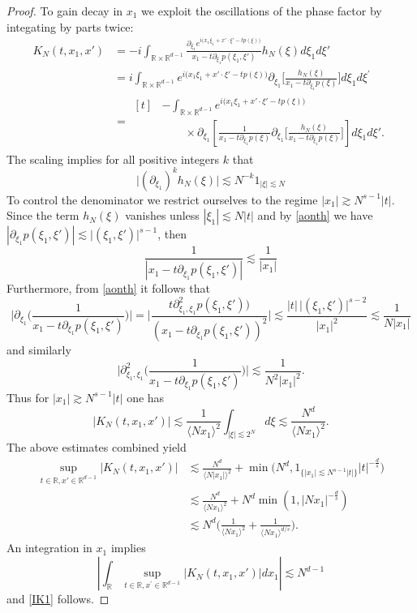 \documentclass[10pt,leqno]{amsart}
\newcommand{\R}{\mathbb{R}}
\numberwithin{equation}{section}
\begin{document}
\begin{proof}
To gain decay in \(x_{1}\) we exploit the oscillations of the phase factor by integating by parts twice:
\begin{align*}
K_{N}(t,x_1 ,x') &=-i\int_{\R \times \R^{d-1}} \frac{
\partial_{\xi_1} e^{i\big(x_1 \xi_1 +x' \cdot \xi' -t p (\xi)\big)}}{x_1 - t\partial_{\xi_{1}}p(\xi_{1}, \xi')}    h_N(\xi)d\xi_1 d\xi'
\\ 
& = i\int_{\R \times \R^{d-1}}  e^{i\big(x_1 \xi_1 +x' \cdot \xi' -t p (\xi)\big)} \partial_{\xi_1} \Big[\frac{h_N(\xi)}{x_1 - t\partial_{\xi_{1}}p (\xi)} \Big] d\xi_1 d\xi^\prime
\\ 
& =
\begin{aligned}[t]
&-\int_{\R \times \R^{d-1}}  e^{i\big(x_1 \xi_1 +x' \cdot \xi' -t p (\xi)\big)}
\\ & 
\qquad\times\partial_{\xi_{1}} \left[\frac{1}{x_1 - t\partial_{\xi_{1}}p (\xi)} \partial_{\xi_{1}}\Big[\frac{h_N(\xi)}{x_1 - t\partial_{\xi_{1}}p (\xi)} \Big]\right] d\xi_1 d\xi'.
\end{aligned}
\end{align*}
The scaling implies for all positive integers $k$ that
\begin{equation*}
\big|(\partial_{\xi_1})^{k} h_N(\xi)\big| \lesssim N^{-k}1_{|\xi|\lesssim N} 
\end{equation*}
To control the denominator we restrict ourselves to the regime  $|x_1| \gtrsim N^{s-1} |t|$. Since the term \(h_{N}(\xi)\) vanishes unless \(|\xi_{1}|\lesssim N|t|\) 
and by \eqref{aonth} we have  $|\partial_{\xi_{1}}p(\xi_{1},\xi')| \lesssim \big|(\xi_{1},\xi')\big|^{s-1}$, then
\begin{equation*}
\frac{1}{|x_1 - t\partial_{\xi_{1}}p(\xi_{1},\xi')|} \lesssim\frac{1}{|x_1|}
\end{equation*}
Furthermore,  from \eqref{aonth} it follows that
$$
\Bigg|\partial_{\xi_1}  \Big(\frac{1}{x_1 - t\partial_{\xi_{1}}p(\xi_1, \xi')}\Big)\Bigg|
=
 \Bigg|\frac{t \partial_{\xi_{1},\xi_1}^{2}p(\xi_1, \xi')) }{(x_1 - t\partial_{\xi_{1}}p(\xi_1, \xi'))^2}\Bigg| \lesssim 
\frac{ |t| \,\big|(\xi_1, \xi')\big|^{s-2} }{|x_1|^{2} } \lesssim 
\frac{1}{N |x_1|}
$$
and similarly 
$$
\Bigg|\partial^2_{\xi_1,\xi_1}  \Big(\frac{1}{x_1 - t\partial_{\xi_{1}}p(\xi_1, \xi')}\Big)\Bigg|
\lesssim
\frac{1}{N^2 |x_1|^2}.
$$
Thus for $|x_1| \gtrsim N^{s-1} |t|$ one has
$$|K_{N}(t,x_1 ,x')|\lesssim 
\frac{1}{\langle N x_1 \rangle^{2}}  \int_{|\xi|\lesssim2^{N}} d\xi \lesssim
  \frac{N^d}{\langle N x_1 \rangle^{2}}.$$
The above estimates combined yield
\begin{align*}
\sup_{t\in \R , x' \in \R^{d-1}} |K_{N} (t,x_1, x')| &\lesssim   \frac{N^d}{\langle N |x_1|\rangle^{2}} +\min\Big(N^d , 1_{\{|x_1| \lesssim N^{s-1} |t|\} }  |t|^{-\frac{d}{s}}\Big)\\
& \lesssim   \frac{N^d}{\langle N x_1\rangle^{2}} + N^d \min \left(1,|Nx_1|^{-\frac{d}{s} } \right)\\
&\lesssim N^{d} \bigg( \frac{1}{\langle N x_1\rangle^{2}}  +\frac{1}{\langle N x_1\rangle^{d/s}} \bigg).
\end{align*}
An integration in $x_1$ implies
$$\left|\int_{\R} \sup_{t\in \R , x^\prime \in \R^{d-1}} |K_{N} (t,x_1, x')| dx_1 \right| \lesssim N^{d-1} 
$$
and \eqref{IK1} follows. 


\end{proof}
\end{document}
